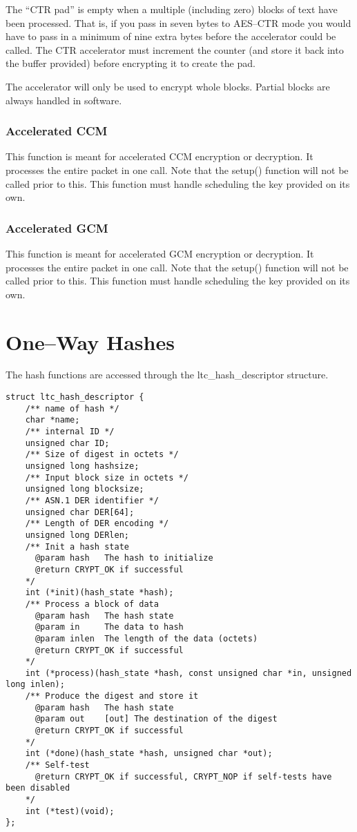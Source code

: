 \documentclass[a4paper]{book}
\begin{document}
The ``CTR pad'' is empty when a multiple (including zero) blocks of text have been processed.  That is, if you pass in seven bytes to AES--CTR mode you would have to 
pass in a minimum of nine extra bytes before the accelerator could be called.  The CTR accelerator must increment the counter (and store it back into the 
buffer provided) before encrypting it to create the pad.  

The accelerator will only be used to encrypt whole blocks.  Partial blocks are always handled in software.

\subsubsection{Accelerated CCM}
This function is meant for accelerated CCM encryption or decryption.  It processes the entire packet in one call.  Note that the setup() function will not
be called prior to this.  This function must handle scheduling the key provided on its own.

\subsubsection{Accelerated GCM}
This function is meant for accelerated GCM encryption or decryption.  It processes the entire packet in one call.  Note that the setup() function will not
be called prior to this.  This function must handle scheduling the key provided on its own.

\section{One--Way Hashes}
The hash functions are accessed through the ltc\_hash\_descriptor structure.

\begin{small}
\begin{verbatim}
struct ltc_hash_descriptor {
    /** name of hash */
    char *name;
    /** internal ID */
    unsigned char ID;
    /** Size of digest in octets */
    unsigned long hashsize;
    /** Input block size in octets */
    unsigned long blocksize;
    /** ASN.1 DER identifier */
    unsigned char DER[64];
    /** Length of DER encoding */
    unsigned long DERlen;
    /** Init a hash state
      @param hash   The hash to initialize
      @return CRYPT_OK if successful
    */
    int (*init)(hash_state *hash);
    /** Process a block of data 
      @param hash   The hash state
      @param in     The data to hash
      @param inlen  The length of the data (octets)
      @return CRYPT_OK if successful
    */
    int (*process)(hash_state *hash, const unsigned char *in, unsigned long inlen);
    /** Produce the digest and store it
      @param hash   The hash state
      @param out    [out] The destination of the digest
      @return CRYPT_OK if successful
    */
    int (*done)(hash_state *hash, unsigned char *out);
    /** Self-test
      @return CRYPT_OK if successful, CRYPT_NOP if self-tests have been disabled
    */
    int (*test)(void);
};
\end{verbatim}
\end{small}
\end{document}
